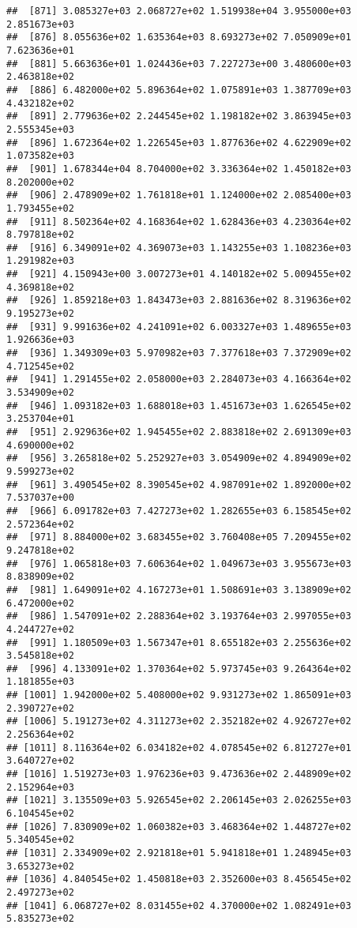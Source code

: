 \documentclass[]{article}
\begin{document}
\begin{verbatim}
##  [871] 3.085327e+03 2.068727e+02 1.519938e+04 3.955000e+03 2.851673e+03
##  [876] 8.055636e+02 1.635364e+03 8.693273e+02 7.050909e+01 7.623636e+01
##  [881] 5.663636e+01 1.024436e+03 7.227273e+00 3.480600e+03 2.463818e+02
##  [886] 6.482000e+02 5.896364e+02 1.075891e+03 1.387709e+03 4.432182e+02
##  [891] 2.779636e+02 2.244545e+02 1.198182e+02 3.863945e+03 2.555345e+03
##  [896] 1.672364e+02 1.226545e+03 1.877636e+02 4.622909e+02 1.073582e+03
##  [901] 1.678344e+04 8.704000e+02 3.336364e+02 1.450182e+03 8.202000e+02
##  [906] 2.478909e+02 1.761818e+01 1.124000e+02 2.085400e+03 1.793455e+02
##  [911] 8.502364e+02 4.168364e+02 1.628436e+03 4.230364e+02 8.797818e+02
##  [916] 6.349091e+02 4.369073e+03 1.143255e+03 1.108236e+03 1.291982e+03
##  [921] 4.150943e+00 3.007273e+01 4.140182e+02 5.009455e+02 4.369818e+02
##  [926] 1.859218e+03 1.843473e+03 2.881636e+02 8.319636e+02 9.195273e+02
##  [931] 9.991636e+02 4.241091e+02 6.003327e+03 1.489655e+03 1.926636e+03
##  [936] 1.349309e+03 5.970982e+03 7.377618e+03 7.372909e+02 4.712545e+02
##  [941] 1.291455e+02 2.058000e+03 2.284073e+03 4.166364e+02 3.534909e+02
##  [946] 1.093182e+03 1.688018e+03 1.451673e+03 1.626545e+02 3.253704e+01
##  [951] 2.929636e+02 1.945455e+02 2.883818e+02 2.691309e+03 4.690000e+02
##  [956] 3.265818e+02 5.252927e+03 3.054909e+02 4.894909e+02 9.599273e+02
##  [961] 3.490545e+02 8.390545e+02 4.987091e+02 1.892000e+02 7.537037e+00
##  [966] 6.091782e+03 7.427273e+02 1.282655e+03 6.158545e+02 2.572364e+02
##  [971] 8.884000e+02 3.683455e+02 3.760408e+05 7.209455e+02 9.247818e+02
##  [976] 1.065818e+03 7.606364e+02 1.049673e+03 3.955673e+03 8.838909e+02
##  [981] 1.649091e+02 4.167273e+01 1.508691e+03 3.138909e+02 6.472000e+02
##  [986] 1.547091e+02 2.288364e+02 3.193764e+03 2.997055e+03 4.244727e+02
##  [991] 1.180509e+03 1.567347e+01 8.655182e+03 2.255636e+02 3.545818e+02
##  [996] 4.133091e+02 1.370364e+02 5.973745e+03 9.264364e+02 1.181855e+03
## [1001] 1.942000e+02 5.408000e+02 9.931273e+02 1.865091e+03 2.390727e+02
## [1006] 5.191273e+02 4.311273e+02 2.352182e+02 4.926727e+02 2.256364e+02
## [1011] 8.116364e+02 6.034182e+02 4.078545e+02 6.812727e+01 3.640727e+02
## [1016] 1.519273e+03 1.976236e+03 9.473636e+02 2.448909e+02 2.152964e+03
## [1021] 3.135509e+03 5.926545e+02 2.206145e+03 2.026255e+03 6.104545e+02
## [1026] 7.830909e+02 1.060382e+03 3.468364e+02 1.448727e+02 5.340545e+02
## [1031] 2.334909e+02 2.921818e+01 5.941818e+01 1.248945e+03 3.653273e+02
## [1036] 4.840545e+02 1.450818e+03 2.352600e+03 8.456545e+02 2.497273e+02
## [1041] 6.068727e+02 8.031455e+02 4.370000e+02 1.082491e+03 5.835273e+02

\end{verbatim}
\end{document}
